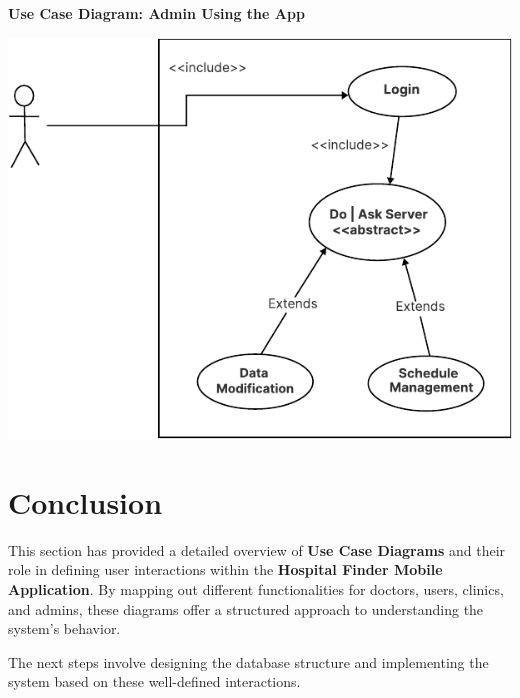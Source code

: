 \documentclass[12pt]{report}
\begin{document}
\vspace{0.5cm}
\noindent \textbf{Use Case Diagram: Admin Using the App}
\begin{center}
	\includegraphics[width=\textwidth]{images/doctorCAS.pdf} %
\end{center}

\section{\textbf{Conclusion}}
\noindent This section has provided a detailed overview of \textbf{Use Case Diagrams} and their role in defining user interactions within the \textbf{Hospital Finder Mobile Application}. By mapping out different functionalities for doctors, users, clinics, and admins, these diagrams offer a structured approach to understanding the system's behavior.

\noindent The next steps involve designing the database structure and implementing the system based on these well-defined interactions.
\end{document}
